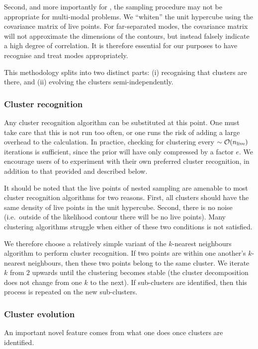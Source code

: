 Second, and more importantly for \PolyChord{}, the sampling procedure may not be appropriate for multi-modal problems. We ``whiten'' the unit hypercube using the covariance matrix of live points. For far-separated modes, the covariance matrix will not approximate the dimensions of the contours, but instead falsely indicate a high degree of correlation.  It is therefore essential for our purposes to have \PolyChord{} recognise and treat modes appropriately.


This methodology splits into two distinct parts:
  (i) recognising that clusters are there, and
  (ii) evolving the clusters semi-independently.

\subsubsection{Cluster recognition}
\label{sec:pc:clustering_recognition}
Any cluster recognition algorithm can be substituted at this point.  One must take care that this is not run too often, or one runs the risk of adding a large overhead to the calculation.  In practice, checking for clustering every ${\sim\mathcal{O}{\left(n_{\mathrm{live}}\right)}}$ iterations is sufficient, since the prior will have only compressed by a factor $e$.  We encourage users of \PolyChord{} to experiment with their own preferred cluster recognition, in addition to that provided and described below. 

It should be noted that the live points of nested sampling are amenable to most cluster recognition algorithms for two reasons.  First, all clusters should have the same density of live points in the unit hypercube.  Second, there is no noise (i.e.\ outside of the likelihood contour there will be no live points). Many clustering algorithms struggle when either of these two conditions is not satisfied.

We therefore choose a relatively simple variant of the $k$-nearest neighbours algorithm to perform cluster recognition.  If two points are within one another's $k$-nearest neighbours, then these two points belong to the same cluster.  We iterate $k$ from $2$ upwards until the clustering becomes stable (the cluster decomposition does not change from one $k$ to the next).  If sub-clusters are identified, then this process is repeated on the new sub-clusters.

\subsubsection{Cluster evolution}
\label{sec:pc:clustering_evolution}
An important novel feature comes from what one does once clusters are identified. 


